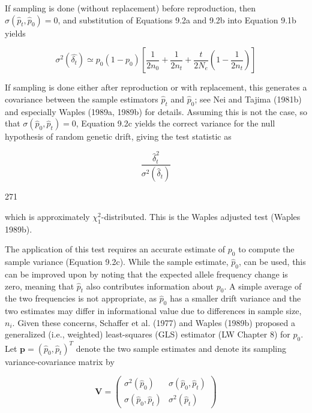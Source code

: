 \documentclass{article}
\begin{document}
If sampling is done (without replacement) before reproduction, then  $ \sigma(\widehat{p}_{t},\widehat{p}_{0})=0 $, and substitution of Equations 9.2a and 9.2b into Equation 9.1b yields

\begin{equation}
\sigma^{2}\left(\widehat{\delta_{t}}\right)\simeq p_{0}(1-p_{0})\left[\frac{1}{2n_{0}}+\frac{1}{2n_{t}}+\frac{t}{2N_{e}}\left(1-\frac{1}{2n_{t}}\right)\right]
\tag{9.2c}
\label{eq:9_2c}
\end{equation}

If sampling is done either after reproduction or with replacement, this generates a covariance between the sample estimators  $ \widehat{p}_t $ and  $ \widehat{p}_0 $; see Nei and Tajima (1981b) and especially Waples (1989a, 1989b) for details. Assuming this is not the case, so that  $ \sigma(\widehat{p}_0, \widehat{p}_t) = 0 $, Equation 9.2c yields the correct variance for the null hypothesis of random genetic drift, giving the test statistic as

\begin{equation}
\frac{\widehat{\delta}_{t}^{2}}{\sigma^{2}\left(\widehat{\delta}_{t}\right)}
\tag{9.2d}
\label{eq:9_2d}
\end{equation}

271

which is approximately  $ \chi_{1}^{2} $-distributed. This is the Waples adjusted test (Waples 1989b).

The application of this test requires an accurate estimate of  $ p_0 $ to compute the sample variance (Equation 9.2c). While the sample estimate,  $ \widehat{p}_0 $, can be used, this can be improved upon by noting that the expected allele frequency change is zero, meaning that  $ \widehat{p}_t $ also contributes information about  $ p_0 $. A simple average of the two frequencies is not appropriate, as  $ \widehat{p}_0 $ has a smaller drift variance and the two estimates may differ in informational value due to differences in sample size,  $ n_i $. Given these concerns, Schaffer et al. (1977) and Waples (1989b) proposed a generalized (i.e., weighted) least-squares (GLS) estimator (LW Chapter 8) for  $ p_0 $. Let  $ \mathbf{p} = (\widehat{p}_0, \widehat{p}_t)^T $ denote the two sample estimates and denote its sampling variance-covariance matrix by

\begin{equation}
\mathbf{V}=\left(\begin{array}{cc}\sigma^{2}\left(\widehat{p}_{0}\right)&\sigma\left(\widehat{p}_{0},\widehat{p}_{t}\right)\\ \sigma\left(\widehat{p}_{0},\widehat{p}_{t}\right)&\sigma^{2}\left(\widehat{p}_{t}\right)\end{array}\right)
\tag{9.3}
\label{eq:9_3}
\end{equation}
\end{document}

